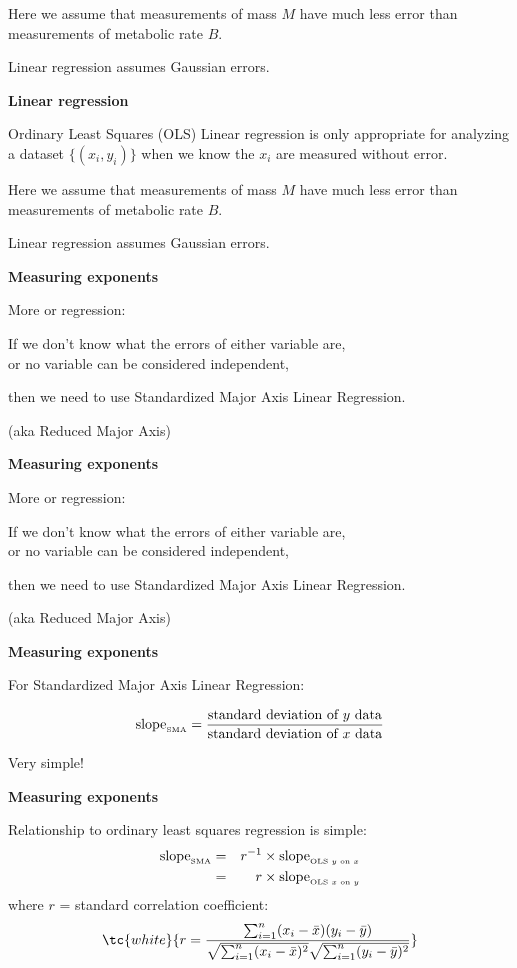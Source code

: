 {Here we assume that measurements of mass $M$
have much less error than measurements of metabolic rate $B$.

\inv

Linear regression assumes Gaussian errors.

\vis


  \textbf{Linear regression}


Ordinary Least Squares (OLS) Linear regression 
is only appropriate for analyzing
a dataset $\{(x_i,y_i)\}$
when we know the $x_i$ are measured without error.

Here we assume that measurements of mass $M$
have much less error than measurements of metabolic rate $B$.

Linear regression assumes Gaussian errors.


  \textbf{Measuring exponents}

More or regression:

If  we don't know what the errors of either variable are,\\
or  no variable can be considered independent,

\inv

then we need to use Standardized Major Axis Linear Regression.

{\small (aka Reduced Major Axis)}

\vis 


  \textbf{Measuring exponents}

More or regression:

If  we don't know what the errors of either variable are,\\
or  no variable can be considered independent,

then we need to use Standardized Major Axis Linear Regression.

{\small (aka Reduced Major Axis)}


  \textbf{Measuring exponents}

For Standardized Major Axis Linear Regression:

$$
\mbox{slope}_{\mbox{\tiny SMA}}
=
\frac{
\mbox{standard deviation of $y$ data}
}
{
\mbox{standard deviation of $x$ data}
}
$$

Very simple!


  \textbf{Measuring exponents}

Relationship to ordinary least squares regression is simple:
\begin{eqnarray*}
\mbox{slope}_{\mbox{\tiny SMA}} & = & r^{-1} \times 
\mbox{slope}_{\mbox{\tiny OLS $y$ on $x$}} \\ 
& = & r \times \mbox{slope}_{\mbox{\tiny OLS $x$ on $y$}}
\end{eqnarray*} \inv
where $r$ = standard correlation coefficient:
$$\tc{white}{
r = \frac{
  \sum_{i=1}^{n} (x_i - \bar{x})(y_i - \bar{y})
}
{
  \sqrt{\sum_{i=1}^{n} (x_i - \bar{x})^2}
  \sqrt{\sum_{i=1}^{n} (y_i - \bar{y})^2}
}
}
$$
\vis


}
